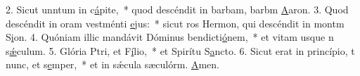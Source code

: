 2. Sicut unntum in c\uline{á}pite,~* quod descéndit in barbam, barbm \uline{A}aron.
3. Quod descéndit in oram vestménti \uline{e}jus:~* sicut ros Hermon, qui descéndit in montm S\uline{i}on.
4. Quóniam illic mandávit Dóminus bendicti\uline{ó}nem,~* et vitam usque n s\uline{ǽ}culum.
5. Glória Ptri, et F\uline{í}lio,~* et Spirítu S\uline{a}ncto.
6. Sicut erat in princípio, t nunc, et s\uline{e}mper,~* et in sǽcula sæculórm. \uline{A}men.
